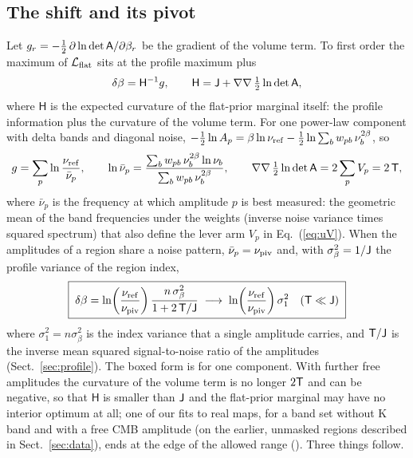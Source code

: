 \subsection{The shift and its pivot}

Let $g_r = -\tfrac12\,\partial \ln\det\mathsf{A}/\partial\beta_r$ be the gradient of the volume term. To first
order the maximum of $\mathcal{L}_{\rm flat}$ sits at the profile maximum plus
\begin{equation}
  \delta\beta = \mathsf{H}^{-1} g , \qquad
  \mathsf{H} = \mathsf{J} + \nabla\nabla\,\tfrac12\ln\det\mathsf{A} ,
  \label{eq:response}
\end{equation}
where $\mathsf{H}$ is the expected curvature of the flat-prior marginal itself: the profile information
plus the curvature of the volume term. For one power-law component with delta bands and diagonal
noise, $-\tfrac12 \ln A_p = \beta\ln\nu_{\mathrm{ref}} - \tfrac12 \ln\sum_b w_{pb}\, \nu_b^{2\beta}$, so
\begin{equation}
  g = \sum_p \ln\frac{\nu_{\mathrm{ref}}}{\bar\nu_p}, \qquad
  \ln\bar\nu_p = \frac{\sum_b w_{pb}\,\nu_b^{2\beta} \ln\nu_b}{\sum_b w_{pb}\,\nu_b^{2\beta}} , \qquad
  \nabla\nabla\,\tfrac12\ln\det\mathsf{A} = 2\sum_p V_p = 2\,\mathsf{T} ,
\end{equation}
where $\bar\nu_p$ is the frequency at which amplitude $p$ is best measured: the geometric mean of the
band frequencies under the weights (inverse noise variance times squared spectrum) that also define
the lever arm $V_p$ in Eq.~(\ref{eq:uV}). When the amplitudes of a region share a noise pattern,
$\bar\nu_p = \nu_{\mathrm{piv}}$ and, with $\sigma_\beta^2 = 1/\mathsf{J}$ the profile variance of the region index,
\begin{equation}
  \boxed{\;\delta\beta = \ln\!\left(\frac{\nu_{\mathrm{ref}}}{\nu_{\mathrm{piv}}}\right) \frac{n\,\sigma_\beta^2}{1 + 2\,\mathsf{T}/\mathsf{J}}
         \;\longrightarrow\; \ln\!\left(\frac{\nu_{\mathrm{ref}}}{\nu_{\mathrm{piv}}}\right) \sigma_1^2
         \quad (\mathsf{T} \ll \mathsf{J})\;}
  \label{eq:shift}
\end{equation}
where $\sigma_1^2 = n\sigma_\beta^2$ is the index variance that a single amplitude carries, and
$\mathsf{T}/\mathsf{J}$ is the inverse mean squared signal-to-noise ratio of the amplitudes (Sect.~\ref{sec:profile}).
The boxed form is for one component. With further free amplitudes the curvature of the volume term
is no longer $2\mathsf{T}$ and can be negative, so that $\mathsf{H}$ is smaller than $\mathsf{J}$ and the flat-prior
marginal may have no interior optimum at all; one of our fits to real maps, for a band set without K band
and with a free CMB amplitude (on the earlier, unmasked regions described in Sect.~\ref{sec:data}), ends
at the edge of the allowed range (). Three things follow.

